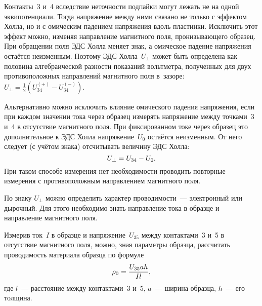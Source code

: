 Контакты~3 и~4 вследствие неточности подпайки могут лежать не на одной
эквипотенциали. Тогда напряжение между ними связано не только с эффектом
Холла, но и с омическим падением напряжения вдоль пластинки. 
Исключить этот эффект можно, изменяя направление магнитного поля, 
пронизывающего образец. 
При обращении поля ЭДС Холла меняет знак, а омическое падение напряжения
остаётся неизменным. Поэтому ЭДС Холла~$U_{\perp}$ может быть определена
как половина алгебраической разности показаний вольтметра, полученных для двух
противоположных направлений магнитного поля в~зазоре:
$U_{\perp} = \frac12 (U_{34}^{(+)}-U_{34}^{(-)})$.

Альтернативно можно исключить влияние омического падения напряжения, 
если при каждом значении тока через образец измерять напряжение
между точками~3 и~4 в отсутствие магнитного поля. При фиксированном токе через
образец это дополнительное к ЭДС Холла напряжение~$U_0$ остаётся неизменным. 
От него следует (с учётом знака) отсчитывать величину ЭДС Холла:
\begin{equation}
	U_{\perp} = U_{34} - U_0.
	\eqmark{3.4.1}
\end{equation}
При таком способе измерения нет необходимости проводить повторные измерения
с противоположным направлением магнитного поля.

По знаку $U_{\perp}$ можно определить характер проводимости~--- 
электронный или дырочный. Для этого необходимо знать направление тока 
в образце и направление магнитного поля.

Измерив ток~$I$ в образце и напряжение~$U_{35}$ между контактами~3 и~5 в
отсутствие магнитного поля, можно, зная
параметры образца, рассчитать проводимость материала образца по формуле
\begin{equation}
	\rho_0=\frac{U_{35}ah}{Il},
	\eqmark{3.4.2}
\end{equation}
где $l$~--- расстояние между контактами~3 и~5, $a$~--- ширина образца, $h$~---
его толщина.

